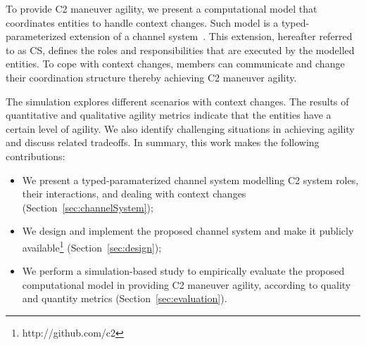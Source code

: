 
To provide C2 maneuver agility, we present a computational model that coordinates entities to handle context changes. Such model is a typed-parameterized extension of a channel system~\citep{modelcheckingBaier}. This extension, hereafter referred to as CS, defines the roles and responsibilities that are executed by the modelled entities. To cope with context changes, members can communicate and change their coordination structure thereby achieving C2 maneuver agility.


The simulation explores different scenarios with context changes. The results of quantitative and qualitative agility metrics indicate that the entities have a certain level of agility. We also identify challenging situations in achieving agility and discuss related tradeoffs. In summary, this work makes the following contributions:

\begin{itemize}
    \item We present a typed-paramaterized channel system modelling C2 system roles, their interactions, and dealing with context changes (Section~\ref{sec:channelSystem});
    \item We design and implement the proposed channel system and make it  publicly available\footnote{http://github.com/c2} (Section~\ref{sec:design});
    \item We perform a simulation-based study to empirically evaluate the proposed computational model in providing C2 maneuver agility, according to quality and quantity metrics (Section~\ref{sec:evaluation}). 
\end{itemize}

